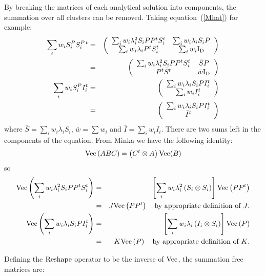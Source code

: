 \documentclass[12pt]{amsart}
\newcommand{\Id}{ {\rm I_D} }
\newcommand{\reshape}{ {\rm Reshape} }
\renewcommand{\vec}{ {\rm Vec} }
\begin{document}
By breaking the matrices of each analytical solution into components, the summation over all clusters can be removed. Taking equation~(\ref{Mhat}) for example:
\begin{eqnarray*}
 \sum_i w_i S_i^P S_i^{P\,t} 
 & = &
          \left( \begin{array}{cc} 
          		\sum_i w_i \lambda_i^2 S_i P P^t S_i^t  &  \sum_i w_i \lambda_i S_i P \\
			\sum_i w_i \lambda_i P^t S_i^t			& \sum_i w_i \Id 
			\end{array}
          \right) \\
& = &
          \left( \begin{array}{cc} 
          		\sum_i w_i \lambda_i^2 S_i P P^t S_i^t  &  \bar{S}P \\
			P^t \bar{S}^t 			& \bar{w} \Id 
			\end{array}
          \right) \\
\sum_i w_i S_i^P I_i^t
& = &
	\left( \begin{array}{c} \sum_i w_i \lambda_i S_i P I_i^t \\ \sum_i w_i I_i^t \end{array} \right) \\
& = &
	\left( \begin{array}{c} \sum_i w_i \lambda_i S_i P I_i^t \\ \bar{I}^t  \end{array} \right)
\end{eqnarray*}
where $\bar{S} = \sum_i w_i \lambda_i S_i$, $\bar{w} = \sum w_i$ and $\bar{I} = \sum_i w_i I_i$. There are two sums left in the components of the equation. From Minka we have the following identity:
\[ \vec\left( A B C \right) = \left( C^t \otimes A \right) \vec(B) \]
so
\begin{eqnarray*}
\vec \left( \sum_i w_i \lambda_i^2 S_i PP^t S_i^t\right)
            & = & \left[ \sum_i w_i \lambda_i^2 \left( S_i \otimes S_i \right) \right] \vec\left( PP^t \right)  \\
            & = & J \vec\left( PP^t \right) \quad \mbox{by appropriate definition of $J$.} \\
\vec \left( \sum_i w_i \lambda_i S_i P I_i^t\right)
            & = &  \left[ \sum_i w_i \lambda_i \left( I_i \otimes S_i \right) \right] \vec\left( P \right)  \\
            & = & K \vec\left( P \right) \quad \mbox{by appropriate definition of $K$.} 
\end{eqnarray*}

Defining the $\reshape$ operator to be the inverse of $\vec$, the summation free matrices are:
\end{document}
